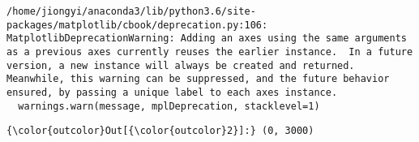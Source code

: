 \documentclass[11pt]{article}
\begin{document}
    \begin{Verbatim}[commandchars=\\\{\}]
/home/jiongyi/anaconda3/lib/python3.6/site-packages/matplotlib/cbook/deprecation.py:106: MatplotlibDeprecationWarning: Adding an axes using the same arguments as a previous axes currently reuses the earlier instance.  In a future version, a new instance will always be created and returned.  Meanwhile, this warning can be suppressed, and the future behavior ensured, by passing a unique label to each axes instance.
  warnings.warn(message, mplDeprecation, stacklevel=1)

    \end{Verbatim}

\begin{Verbatim}[commandchars=\\\{\}]
{\color{outcolor}Out[{\color{outcolor}2}]:} (0, 3000)
\end{Verbatim}
            
    \begin{center}
    \end{center}
    { \hspace*{\fill} \\}
    

    
    
    
    
\end{document}
